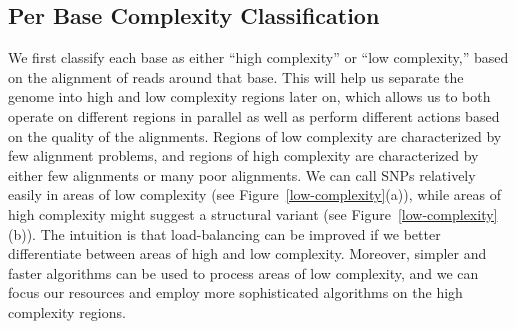 \documentclass[12pt]{article}
\begin{document}
\subsection{Per Base Complexity Classification}
\label{sec:classification}
We first classify each base as either 
``high complexity'' or 
``low complexity,'' based on the alignment of reads around that base. This will help us separate the genome into high and low complexity regions later on, which 
allows us to both operate on different regions in
parallel as well as perform different actions based on the quality of the
alignments.  Regions of low complexity are characterized by few alignment
problems, and regions of high complexity are characterized by either few
alignments or many poor alignments.  We can call SNPs relatively easily in
areas of low complexity (see Figure~\ref{low-complexity}(a)), while areas of
high complexity might suggest a structural variant (see
Figure~\ref{low-complexity}(b)).
The intuition is that load-balancing can be improved if we better differentiate
between areas of high and low complexity.  Moreover, 
simpler and faster algorithms can be used to process areas of low
complexity, and we can focus our resources and employ more
sophisticated algorithms on the high complexity regions.
\end{document}

